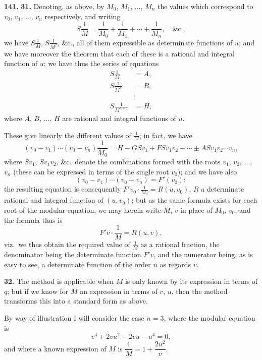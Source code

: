 \documentclass[11pt,a4paper]{article}
\theoremstyle{plain}
\begin{document}
\newpage
\noindent\textbf{141.} \textbf{31.} Denoting, as above, by $M_0$, $M_1$, $\ldots$, $M_n$ the values which correspond to $v_0$, $v_1$, $\ldots$, $v_n$ respectively, and writing
\[
S\frac{1}{M} = \frac{1}{M_0} + \frac{1}{M_1} + \cdots + \frac{1}{M_n}, \quad \&\text{c.},
\]
we have $S\frac{1}{M}$, $S\frac{1}{M^2}$, \&c., all of them expressible as determinate functions of $u$; and we have moreover the theorem that each of these is a rational and integral function of $u$: we have thus the series of equations
\begin{align*}
S\frac{1}{M} &= A, \\
S\frac{1}{M^2} &= B, \\
&\vdots \\
S\frac{1}{M^{n+1}} &= H,
\end{align*}
where $A$, $B$, $\ldots$, $H$ are rational and integral functions of $u$.

These give linearly the different values of $\frac{1}{M}$; in fact, we have
\[
(v_0 - v_1)\cdots(v_0 - v_n)\frac{1}{M_0} = H - GSv_1 + FSv_1v_2 - \cdots \pm ASv_1v_2\cdots v_n,
\]
where $Sv_1$, $Sv_1v_2$, \&c.\ denote the combinations formed with the roots $v_1$, $v_2$, $\ldots$, $v_n$ (these can be expressed in terms of the single root $v_0$); and we have also
\[
(v_0 - v_1)\cdots(v_0 - v_n) = F'(v_0):
\]
the resulting equation is consequently $F'v_0 \cdot \frac{1}{M_0} = R(u, v_0)$, $R$ a determinate rational and integral function of $(u, v_0)$; but as the same formula exists for each root of the modular equation, we may herein write $M$, $v$ in place of $M_0$, $v_0$; and the formula thus is
\[
F'v \cdot \frac{1}{M} = R(u, v),
\]
viz.\ we thus obtain the required value of $\frac{1}{M}$ as a rational fraction, the denominator being the determinate function $F'v$, and the numerator being, as is easy to see, a determinate function of the order $n$ as regards $v$.

\medskip
\noindent\textbf{32.} The method is applicable when $M$ is only known by its expression in terms of $q$; but if we know for $M$ an expression in terms of $v$, $u$, then the method transforms this into a standard form as above.

By way of illustration I will consider the case $n = 3$, where the modular equation is
\[
v^4 + 2vu^2 - 2vu - u^4 = 0,
\]
and where a known expression of $M$ is $\dfrac{1}{M} = 1 + \dfrac{2u^2}{v}$.
\end{document}

